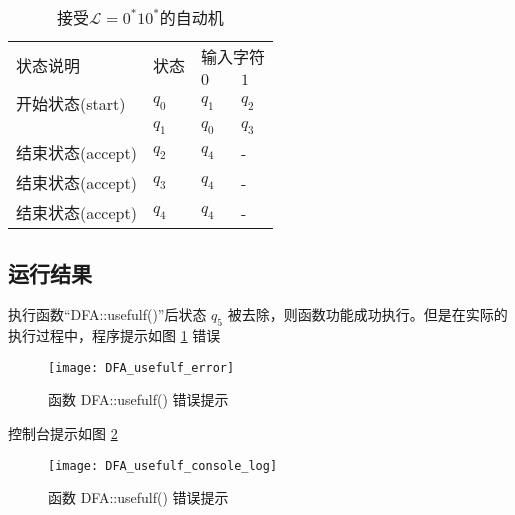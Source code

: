 \begin{table}[!htbp]
    \caption{接受{$\mathcal{L}=0^*10^*$}的自动机{\cite{book1}}}
    \label{tab:DFA4_1}
    \centering
    \small%
    \setlength{\tabcolsep}{4pt}%
    \renewcommand{\arraystretch}{1.2}%
        \begin{tabular}{l p{4em}<{\centering} p{3em}<{\centering} p{3em}<{\centering}}
        \toprule %
        \multirow{2}{*}{状态说明} & \multirow{2}{*}{状态} & \multicolumn{2}{c}{输入字符} \\
		\cline{3-4}      &    &$0$ & $1$  \\
        \midrule%
        开始状态(start)  & $q_0$ & $q_1$   & $q_2$   \\
                        & $q_1$ & $q_0$   & $q_3$   \\
        结束状态(accept) & $q_2$ & $q_4$   & -   \\
        结束状态(accept) & $q_3$ & $q_4$   & -   \\
        结束状态(accept) & $q_4$ & $q_4$   & -   \\
        \bottomrule%
    \end{tabular}
\end{table}

\subsection{运行结果}

执行函数“DFA::usefulf()”后状态 $q_5$ 被去除，则函数功能成功执行。但是在实际的执行过程中，程序提示如图 \ref{fig::usefulf_error} 错误 

\begin{figure}[!htbp]
    \centering
    \texttt{[image: DFA\_usefulf\_error]}
    \caption{函数 DFA::usefulf() 错误提示}
    \label{fig::usefulf_error}
\end{figure}
控制台提示如图 \ref{fig::usefulf_console_log}
\begin{figure}[!htbp]
    \centering
    \texttt{[image: DFA\_usefulf\_console\_log]}
    \caption{函数 DFA::usefulf() 错误提示}
    \label{fig::usefulf_console_log}
\end{figure}


